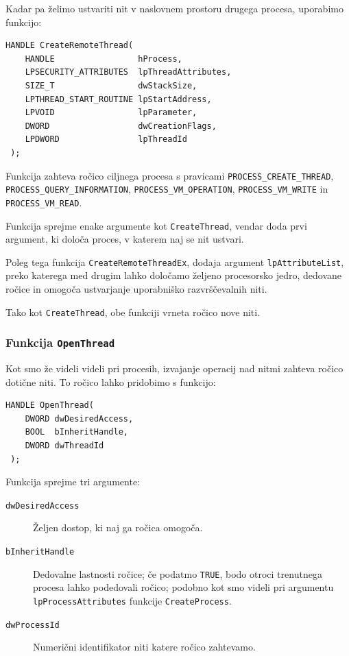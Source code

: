 \documentclass[a4paper,12pt,openright]{book}
\begin{document}
Kadar pa želimo ustvariti nit v naslovnem prostoru drugega procesa, uporabimo funkcijo:
\begin{lstlisting}[style=func]
 HANDLE CreateRemoteThread(
	HANDLE                 hProcess,
	LPSECURITY_ATTRIBUTES  lpThreadAttributes,
	SIZE_T                 dwStackSize,
	LPTHREAD_START_ROUTINE lpStartAddress,
	LPVOID                 lpParameter,
	DWORD                  dwCreationFlags,
	LPDWORD                lpThreadId
 );
\end{lstlisting}

Funkcija zahteva ročico ciljnega procesa s pravicami \texttt{PROCESS\_CREATE\-\_THREAD}, \texttt{PROCESS\_QUERY\_INFORMATION}, \texttt{PROCESS\_VM\-\_OPERATION}, \texttt{PROCESS\-\_VM\_WRITE} in \texttt{PROCESS\_VM\_READ}.

Funkcija sprejme enake argumente kot \texttt{CreateThread}, vendar doda prvi argument, ki določa proces, v katerem naj se nit ustvari.

Poleg tega funkcija \texttt{CreateRemoteThreadEx}, dodaja argument \texttt{lpAttri\-buteList}, preko katerega med drugim lahko določamo željeno procesorsko jedro, dedovane ročice in omogoča ustvarjanje uporabniško razvrščevalnih niti.

Tako kot \texttt{CreateThread}, obe funkciji vrneta ročico nove niti.

\subsubsection{Funkcija \texttt{OpenThread}}

Kot smo že videli videli pri procesih, izvajanje operacij nad nitmi zahteva ročico dotične niti.
To ročico lahko pridobimo s funkcijo:
\begin{lstlisting}[style=func]
 HANDLE OpenThread(
	DWORD dwDesiredAccess,
	BOOL  bInheritHandle,
	DWORD dwThreadId
 );
\end{lstlisting}

Funkcija sprejme tri argumente:
\begin{description}
	\item[\texttt{dwDesiredAccess}] Željen dostop, ki naj ga ročica omogoča.
	\item[\texttt{bInheritHandle}] Dedovalne lastnosti ročice; če podatmo \texttt{TRUE}, bodo otroci trenutnega procesa lahko podedovali ročico; podobno kot smo videli pri argumentu \texttt{lpProcessAttributes} funkcije \texttt{CreateProcess}.
	\item[\texttt{dwProcessId}] Numerični identifikator niti katere ročico zahtevamo.
\end{description}
\end{document}
